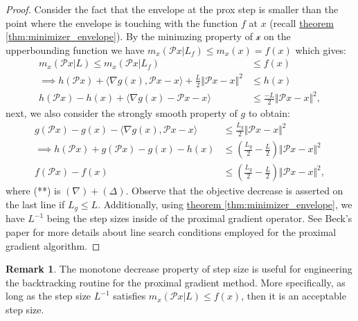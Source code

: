 \documentclass[]{article}
\theoremstyle{definition}
\newtheorem{remark}{Remark}[subsection]
{
    \newtheorem{assumption}{Assumption}
}
\begin{document}
        \begin{proof}Consider the fact that the envelope at the prox step is smaller than the point where the envelope is touching with the function $f$ at $x$ (recall \hyperref[thm:minimizer_envelope]{theorem \ref*{thm:minimizer_envelope}}). By the minimzing property of $\mathcal x$ on the upperbounding function we have $m_x(\mathcal Px|L_f)\le m_x(x) = f(x)$ which gives: 
            \begin{align*}
                m_x(\mathcal Px|L) \le m_x(\mathcal Px|L_f) 
                &\le f(x)
                \\
                \implies h(\mathcal Px)+ 
                \langle \nabla g(x), \mathcal P x - x\rangle + \frac{L}{2}\Vert \mathcal Px - x\Vert^2 
                &\le h(x)
                \\
                h(\mathcal Px) - h(x) + \langle \nabla g(x) - \mathcal Px - x\rangle 
                &\le \frac{-L}{2} \Vert \mathcal Px - x\Vert^2, \tag{$\Delta$}
            \end{align*}
            next, we also consider the strongly smooth property of $g$ to obtain: 
            \begin{align*}
                g(\mathcal Px) - g(x) - \langle \nabla g(x), \mathcal Px - x\rangle 
                & \le \frac{L_g}{2}\Vert \mathcal Px - x\Vert^2 \tag{$\nabla$}
                \\
                \implies
                h(\mathcal Px) + g(\mathcal Px) - g(x) - h(x)
                &\le 
                \left(
                    \frac{L_g}{2} - \frac{L}{2}
                \right)\Vert \mathcal Px - x\Vert^2 \tag{**}
                \\
                f(\mathcal Px) - f(x) 
                &\le
                \left(
                    \frac{L_g}{2} - \frac{L}{2}
                \right)\Vert \mathcal Px - x\Vert^2, 
            \end{align*}
            where (**) is $(\nabla) + (\Delta)$. Observe that the objective decrease is asserted on the last line if $L_g \le L$. Additionally, using \hyperref[thm:minimizer_envelope]{theorem \ref*{thm:minimizer_envelope}}, we have $L^{-1}$ being the step sizes inside of the proximal gradient operator. See Beck's paper \cite{paper:FISTA} for more details about line search conditions employed for the proximal gradient algorithm.
        \end{proof}
        \begin{remark}
            The monotone decrease property of step size is useful for engineering the backtracking routine for the proximal gradient method. More specifically, as long as the step size $L^{-1}$ satisfies $m_x(\mathcal Px | L)\le f(x)$, then it is an acceptable step size. 
        \end{remark}
\end{document}
